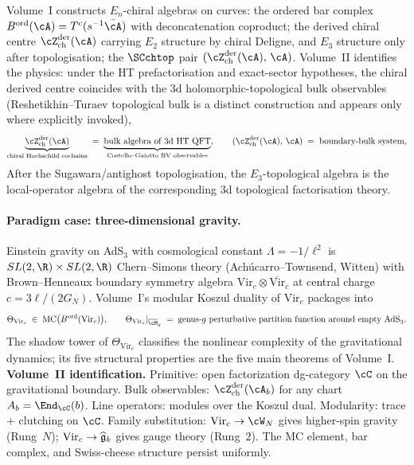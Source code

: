 Volume~I constructs $E_n$-chiral algebras on curves: the ordered
bar complex $B^{\mathrm{ord}}(\cA) = T^c(s^{-1}\bar\cA)$ with
deconcatenation coproduct; the derived chiral centre
$\cZ^{\mathrm{der}}_{\mathrm{ch}}(\cA)$ carrying $E_2$ structure
by chiral Deligne, and $E_3$ structure only after topologisation;
the $\SCchtop$ pair
$(\cZ^{\mathrm{der}}_{\mathrm{ch}}(\cA),\, \cA)$.
Volume~II identifies the physics: under the HT prefactorisation
and exact-sector hypotheses, the chiral derived centre coincides
with the 3d holomorphic-topological bulk observables
(Reshetikhin--Turaev topological bulk is a distinct construction
and appears only where explicitly invoked),
\[
 \underbrace{\cZ^{\mathrm{der}}_{\mathrm{ch}}(\cA)}_{\text{chiral Hochschild cochains}}
 \;=\;
 \underbrace{\text{bulk algebra of 3d HT QFT}}_{\text{Costello--Gaiotto BV observables}},
 \qquad
 (\cZ^{\mathrm{der}}_{\mathrm{ch}}(\cA),\, \cA)
 \;=\;
 \text{boundary-bulk system},
\]
After the Sugawara/antighost topologisation, the $E_3$-topological
algebra is the local-operator algebra of the corresponding 3d
topological factorisation theory.

\paragraph{Paradigm case: three-dimensional gravity.}
Einstein gravity on AdS$_3$ with cosmological constant
$\Lambda = -1/\ell^2$ is $SL(2, \R) \times SL(2, \R)$
Chern--Simons theory (Ach\'ucarro--Townsend, Witten) with
Brown--Henneaux boundary symmetry algebra
$\mathrm{Vir}_c \otimes \overline{\mathrm{Vir}}_c$ at central
charge $c = 3\ell/(2G_N)$. Volume~I's modular Koszul duality of
$\mathrm{Vir}_c$ packages into
\[
 \Theta_{\mathrm{Vir}_c} \;\in\; \mathrm{MC}\bigl(B^{\mathrm{ord}}(\mathrm{Vir}_c)\bigr),
 \qquad
 \Theta_{\mathrm{Vir}_c}|_{\overline{\cM}_g}
 \;=\;
 \text{genus-$g$ perturbative partition function around empty AdS}_3.
\]
The shadow tower of $\Theta_{\mathrm{Vir}_c}$ classifies the
nonlinear complexity of the gravitational dynamics; its five
structural properties are the five main theorems of Volume~I.
\textbf{Volume~II identification.}
Primitive: open factorization dg-category $\cC$ on the
gravitational boundary. Bulk observables:
$\cZ^{\mathrm{der}}_{\mathrm{ch}}(\cA_b)$ for any chart
$A_b = \End_\cC(b)$. Line operators: modules over the Koszul
dual. Modularity: trace + clutching on $\cC$. Family
substitution: $\mathrm{Vir}_c \to \cW_N$ gives higher-spin
gravity (Rung~$N$); $\mathrm{Vir}_c \to \widehat{\mathfrak{g}}_k$ gives
gauge theory (Rung~$2$). The MC element, bar complex, and
Swiss-cheese structure persist uniformly.

